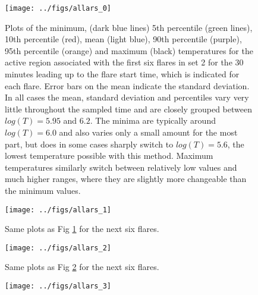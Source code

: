 \documentclass[namedreferences]{solarphysics}
\begin{document}
\begin{article}
\begin{figure}
\begin{centering}
\texttt{[image: ../figs/allars\_0]} 
\par\end{centering}

\caption{Plots of the minimum, (dark blue lines) 5th percentile (green lines), 10th percentile (red), mean (light blue), 90th percentile (purple), 95th percentile (orange) and maximum (black) temperatures for the active region associated with the first six flares in set 2 for the 30 minutes leading up to the flare start time, which is indicated for each flare.
Error bars on the mean indicate the standard deviation.
In all cases the mean, standard deviation and percentiles vary very little throughout the sampled time and are closely grouped between $log(T)=5.95$ and $6.2$.
The minima are typically around $log(T)=6.0$ and also varies only a small amount for the most part, but does in some cases sharply switch to $log(T)=5.6$, the lowest temperature possible with this method.
Maximum temperatures similarly switch between relatively low values and much higher ranges, where they are slightly more changeable than the minimum values.\label{fig:temps-v-time-xflares}}
\end{figure}

\begin{figure}
\begin{centering}
\texttt{[image: ../figs/allars\_1]} 
\par\end{centering}

\caption{Same plots as Fig \ref{fig:temps-v-time-xflares} for the next six flares.
\label{fig:temps-v-time-xflares-2}}
\end{figure}

\begin{figure}
\begin{centering}
\texttt{[image: ../figs/allars\_2]} 
\par\end{centering}

\caption{Same plots as Fig \ref{fig:temps-v-time-xflares-2} for the next six flares.
\label{fig:temps-v-time-xflares-3}}
\end{figure}

\begin{figure}
\begin{centering}
\texttt{[image: ../figs/allars\_3]} 
\par\end{centering}


\end{figure}
\end{article}
\end{document}
